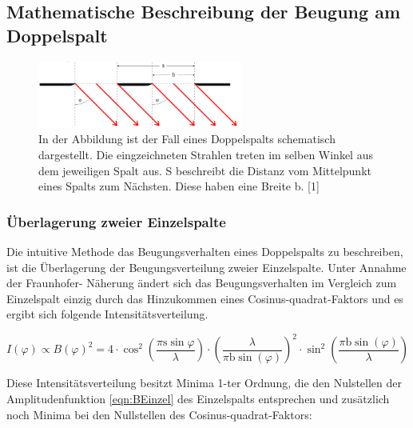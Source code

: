 \documentclass[titlepage = firstcover]{scrartcl}
\begin{document}
            \newpage
            \subsection{Mathematische Beschreibung der Beugung am Doppelspalt}
                \FloatBarrier

                \begin{figure}[h]
                  \centering
                  \includegraphics[width = 0.6\textwidth]{Bilder/Doppelspalt.png}
                  \caption{In der Abbildung ist der Fall eines Doppelspalts schematisch dargestellt. Die eingzeichneten Strahlen treten im selben Winkel aus dem jeweiligen Spalt aus. S beschreibt die Distanz vom Mittelpunkt eines Spalts zum Nächsten. Diese haben eine Breite b. [1]}
                  \label{fig:Doppelspalt}
                \end{figure}
            
                \FloatBarrier
            
                \noindent
                \subsubsection*{Überlagerung zweier Einzelspalte}
                    Die intuitive Methode das Beugungsverhalten eines Doppelspalts zu beschreiben, ist die Überlagerung der Beugungsverteilung zweier Einzelspalte. Unter Annahme der Fraunhofer-
                    Näherung ändert sich das Beugungsverhalten im Vergleich zum Einzelspalt einzig durch das Hinzukommen eines Cosinus-quadrat-Faktors und es ergibt sich folgende 
                    Intensitätsverteilung.

                    \begin{equation}
                        I(\varphi) \propto B(\varphi)^2 = 4 \cdot \cos^2\left(\frac{\pi \text{s} \sin \varphi}{\lambda}\right) \cdot \left(\frac{\lambda}{\pi \text{b} \sin(\varphi)}\right)^2 \cdot \sin^2 \left(\frac{\pi \text{b} \sin(\varphi)}{\lambda}\right)
                        \label{eqn:IDoppel}
                    \end{equation}

                    \noindent
                    Diese Intensitätsverteilung besitzt Minima 1-ter Ordnung, die den Nulstellen der Amplitudenfunktion \ref{eqn:BEinzel} des Einzelspalts entsprechen und zusätzlich noch Minima bei
                    den Nullstellen des Cosinus-quadrat-Faktors:
\end{document}
